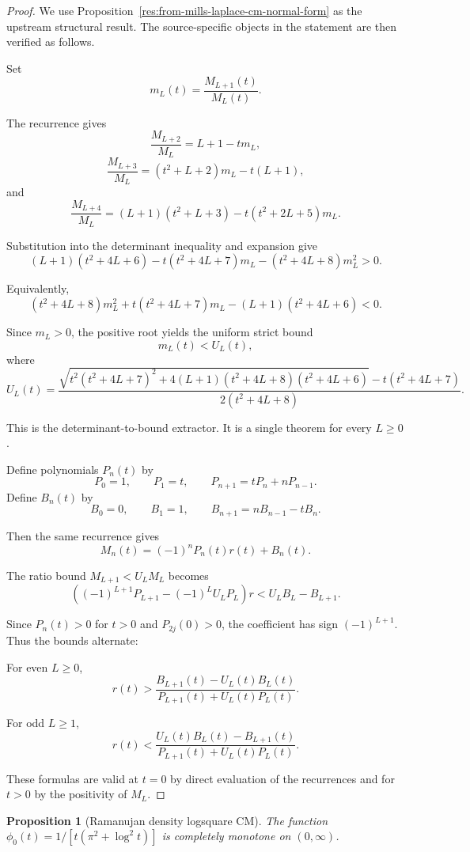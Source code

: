 \documentclass[11pt]{article}
\numberwithin{equation}{section}
\newtheorem{proposition}[theorem]{Proposition}
\theoremstyle{definition}
\theoremstyle{remark}
\newcommand{\1}{\mathbf 1}
\begin{document}
\begin{proof}
We use Proposition~\ref{res:from-mills-laplace-cm-normal-form} as the upstream structural result. The source-specific objects in the statement are then verified as follows.

Set
\[
m_L(t)=\frac{M_{L+1}(t)}{M_L(t)}.
\]

The recurrence gives
\[
\frac{M_{L+2}}{M_L}=L+1-tm_L,
\]
\[
\frac{M_{L+3}}{M_L}=(t^2+L+2)m_L-t(L+1),
\]
and
\[
\frac{M_{L+4}}{M_L}=(L+1)(t^2+L+3)-t(t^2+2L+5)m_L.
\]

Substitution into the determinant inequality and expansion give
\[
(L+1)(t^2+4L+6)-t(t^2+4L+7)m_L-(t^2+4L+8)m_L^2>0.
\]

Equivalently,
\[
(t^2+4L+8)m_L^2+t(t^2+4L+7)m_L-(L+1)(t^2+4L+6)<0.
\]

Since \(m_L>0\), the positive root yields the uniform strict bound
\[
m_L(t)<U_L(t),
\]
where
\[
U_L(t)=
\frac{
\sqrt{t^2(t^2+4L+7)^2+4(L+1)(t^2+4L+8)(t^2+4L+6)}
-t(t^2+4L+7)
}
{2(t^2+4L+8)}.
\]

This is the determinant-to-bound extractor. It is a single theorem for every \(L\ge0\).

Define polynomials \(P_n(t)\) by
\[
P_0=1,\qquad P_1=t,\qquad P_{n+1}=tP_n+nP_{n-1}.
\]
Define \(B_n(t)\) by
\[
B_0=0,\qquad B_1=1,\qquad B_{n+1}=nB_{n-1}-tB_n.
\]

Then the same recurrence gives
\[
M_n(t)=(-1)^nP_n(t)r(t)+B_n(t).
\]

The ratio bound \(M_{L+1}<U_LM_L\) becomes
\[
\left((-1)^{L+1}P_{L+1}-(-1)^L U_LP_L\right)r
<U_LB_L-B_{L+1}.
\]

Since \(P_n(t)>0\) for \(t>0\) and \(P_{2j}(0)>0\), the coefficient has sign \((-1)^{L+1}\). Thus the bounds alternate:

For even \(L\ge0\),
\[
r(t)>
\frac{B_{L+1}(t)-U_L(t)B_L(t)}
{P_{L+1}(t)+U_L(t)P_L(t)}.
\]

For odd \(L\ge1\),
\[
r(t)<
\frac{U_L(t)B_L(t)-B_{L+1}(t)}
{P_{L+1}(t)+U_L(t)P_L(t)}.
\]

These formulas are valid at \(t=0\) by direct evaluation of the recurrences and for \(t>0\) by the positivity of \(M_L\).
\end{proof}

\begin{proposition}[Ramanujan density logsquare CM]
\label{res:ramanujan-density-logsquare-cm}
The function \(\phi_0(t)=1/[t(\pi^2+\log^2 t)]\) is completely monotone on \((0,\infty)\).
\end{proposition}
\end{document}
